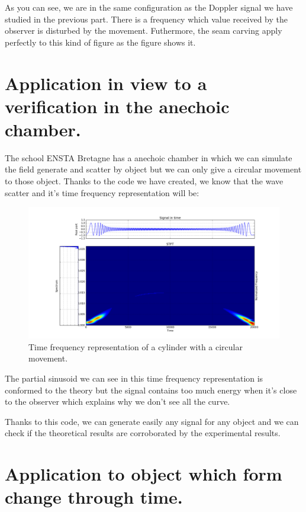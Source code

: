As you can see, we are in the same configuration as the Doppler signal we have studied in the previous part. There is a frequency which value received by the observer is disturbed by the movement. Futhermore, the seam carving apply perfectly to this kind of figure as the figure \label{SpectrogramObjMov_LawFound} shows it.

\section{Application in view to a verification in the anechoic chamber.}

The school ENSTA Bretagne has a anechoic chamber in which we can simulate the field generate and scatter by object but we can only give a circular movement to those object. Thanks to the code we have created, we know that the wave scatter and it's time frequency representation will be:

\begin{figure}[H]
\centering
    \includegraphics[scale=0.35,angle=0]{Images/TFR3.png}
    \caption{Time frequency representation of a cylinder with a circular movement.}
    \label{fig:TFR3}
\end{figure}

The partial sinusoid we can see in this time frequency representation is conformed to the theory but the signal contains too much energy when it's close to the observer which explains why we don't see all the curve.

Thanks to this code, we can generate easily any signal for any object and we can check if the theoretical results are corroborated by the experimental results.

\section{Application to object which form change through time.}

